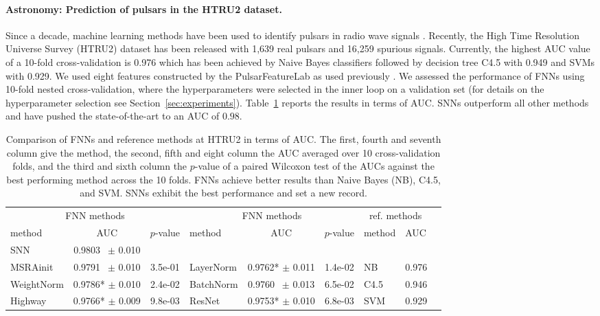 \documentclass{article}
\begin{document}
\paragraph{Astronomy: Prediction of pulsars in the HTRU2 dataset.}  

Since a decade, machine learning methods have been used to identify pulsars in radio wave signals \citep{bib:Lyon2016a}.
Recently, the High Time Resolution Universe Survey (HTRU2) dataset has been released with
1,639 real pulsars and 16,259 spurious signals.
Currently, the highest AUC value of a 10-fold cross-validation is 0.976
which has been achieved by Naive Bayes classifiers followed by decision tree C4.5 with 0.949 and SVMs with 0.929.
We used eight features constructed by the PulsarFeatureLab as used previously \citep{bib:Lyon2016a}.
We assessed the performance of FNNs using 10-fold nested cross-validation,
where the hyperparameters were selected in the inner loop on a validation set (for details on the hyperparameter selection see Section~\ref{sec:experiments}). 
Table~\ref{tab:HTRU2} reports the results
in terms of AUC. SNNs outperform all other methods and have pushed the state-of-the-art 
to an AUC of $0.98$. 


\begin{table}[ht]
\caption[Comparison of FNNs and reference methods at HTRU2]{Comparison of FNNs and reference methods at HTRU2 
in terms of AUC. 
The first, fourth and seventh column give the method, 
the second, fifth and eight column the AUC averaged over 10 cross-validation folds, 
and the third and sixth column the $p$-value of a paired Wilcoxon test of the AUCs against 
the best performing method across the 10 folds. 
FNNs achieve better results than Naive Bayes (NB), C4.5, and SVM.
SNNs exhibit the best performance and set a new record. \label{tab:HTRU2}}
\centering
\begin{tabular}{lcclccllc}
  \toprule
  \multicolumn{3}{c}{FNN methods}   &  \multicolumn{3}{c}{FNN methods} & \multicolumn{2}{c}{ref. methods}  \\
   method &  AUC & $p$-value & method &  AUC & $p$-value & method &  AUC  \\ 
  \midrule
  SNN           &    0.9803$\ \ $ \tiny $\pm$  0.010 &    & & & & &                     \\ 
  MSRAinit      & 0.9791$\ \ $  \tiny $\pm$  0.010 & \tiny3.5e-01       &  LayerNorm  & 0.9762* \tiny $\pm$  0.011 & \tiny { 1.4e-02}     & NB &0.976      \\ 
  WeightNorm    & 0.9786*         \tiny $\pm$  0.010 & \tiny{ 2.4e-02} &  BatchNorm  & 0.9760$\ \ $ \tiny $\pm$  0.013 & \tiny 6.5e-02                & C4.5 & 0.946  \\ 
  Highway       & 0.9766*         \tiny $\pm$  0.009 & \tiny{ 9.8e-03} & ResNet & 0.9753* \tiny $\pm$ 0.010 & \tiny 6.8e-03       & SVM  & 0.929\\ 
   \bottomrule
\end{tabular}
\end{table}
\end{document}
